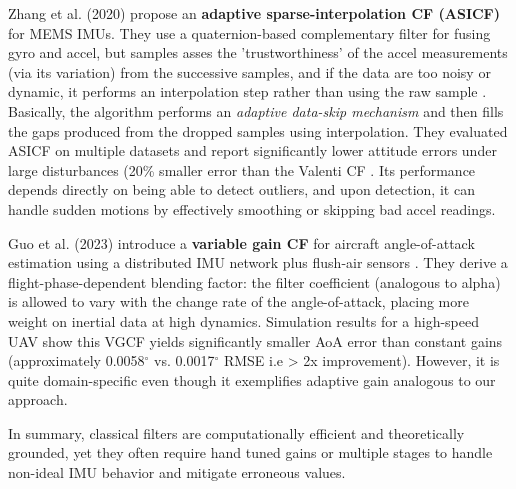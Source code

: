 \documentclass{iutbscthesis}
\begin{document}
Zhang et al. (2020) propose an \textbf{adaptive sparse-interpolation CF (ASICF)} for MEMS IMUs. They use a quaternion-based complementary filter for fusing gyro and accel, but samples asses the 'trustworthiness' of the accel measurements (via its variation) from the successive samples, and if the data are too noisy or dynamic, it performs an interpolation step rather than using the raw sample \cite{wang2020mems}. Basically, the algorithm performs an \textit{adaptive data-skip mechanism} and then fills the gaps produced from the dropped samples using interpolation. They evaluated ASICF on multiple datasets and report significantly lower attitude errors under large disturbances (20\% smaller error than the Valenti CF \cite{wang2020mems}. Its performance depends directly on being able to detect outliers, and upon detection, it can handle sudden motions by effectively smoothing or skipping bad accel readings.

Guo et al. (2023) introduce a \textbf{variable gain CF} for aircraft angle-of-attack estimation using a distributed IMU network plus flush-air sensors \cite{shao2023variablegainflushsesnsing}. They derive a flight-phase-dependent blending factor: the filter coefficient (analogous to alpha) is allowed to vary with the change rate of the angle-of-attack, placing more weight on inertial data at high dynamics. Simulation results for a high-speed UAV show this VGCF yields significantly smaller AoA error than constant gains (approximately 0.0058$^{\circ}$ vs. 0.0017$^{\circ}$ RMSE i.e > 2x improvement). However, it is quite domain-specific even though it exemplifies adaptive gain analogous to our approach. 

In summary, classical filters are computationally efficient and theoretically grounded, yet they often require hand tuned gains or multiple stages to handle non-ideal IMU behavior and mitigate erroneous values. 
\end{document}
